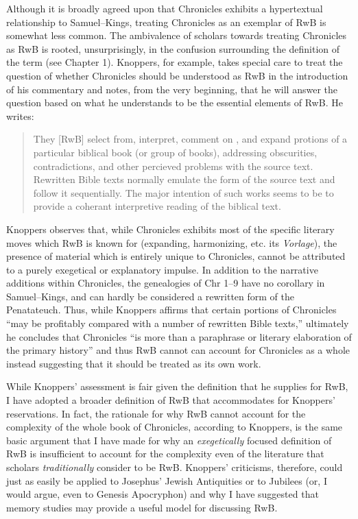 Although it is broadly agreed upon that Chronicles exhibits a
hypertextual\autocite[5]{genette1997} relationship to Samuel--Kings,
treating Chronicles as an exemplar of RwB is somewhat less
common.\autocites[Though, not particularly
\emph{un}common:][]{campbell_zsengeller2014}{zahn_lim-collins2010}{bernstein_textus2005}[Alexander
considers Chronicles to be a ``prototype'' of RwB,
see][100]{alexander_carson-williamson1988} The ambivalence of scholars
towards treating Chronicles as RwB is rooted, unsurprisingly, in the
confusion surrounding the definition of the term (see Chapter 1).
Knoppers, for example, takes special care to treat the question of
whether Chronicles should be understood as RwB in the introduction of
his commentary and notes, from the very beginning, that he will answer
the question based on what he understands to be the essential elements
of RwB.\autocite[ , 129--134]{knoppers2003} He writes:

\begin{quote}
They {[}RwB{]} select from, interpret, comment on , and expand protions
of a particular biblical book (or group of books), addressing
obscurities, contradictions, and other percieved problems with the
source text. Rewritten Bible texts normally emulate the form of the
source text and follow it sequentially. The major intention of such
works seems to be to provide a coherant interpretive reading of the
biblical text.\autocite[130]{knoppers2003}
\end{quote}

Knoppers observes that, while Chronicles exhibits most of the specific
literary moves which RwB is known for (expanding, harmonizing, etc. its
\emph{Vorlage}), the presence of material which is entirely unique to
Chronicles, cannot be attributed to a purely exegetical or explanatory
impulse. In addition to the narrative additions within Chronicles, the
genealogies of Chr 1--9 have no corollary in Samuel--Kings, and can
hardly be considered a rewritten form of the
Penatateuch.\autocite[132]{knoppers2003} Thus, while Knoppers affirms
that certain portions of Chronicles ``may be profitably compared with a
number of rewritten Bible texts,''\autocite[131]{knoppers2003}
ultimately he concludes that Chronicles ``is more than a paraphrase or
literary elaboration of the primary
history''\autocite[134]{knoppers2003} and thus RwB cannot can account
for Chronicles as a whole instead suggesting that it should be treated
as its own work.\autocite[131--134]{knoppers2003}

While Knoppers' assessment is fair given the definition that he supplies
for RwB, I have adopted a broader definition of RwB that accommodates
for Knoppers' reservations. In fact, the rationale for why RwB cannot
account for the complexity of the whole book of Chronicles, according to
Knoppers, is the same basic argument that I have made for why an
\emph{exegetically} focused definition of RwB is insufficient to account
for the complexity even of the literature that scholars
\emph{traditionally} consider to be RwB. Knoppers' criticisms,
therefore, could just as easily be applied to Josephus'
Jewish Antiquities or to Jubilees (or, I would argue, even to
Genesis Apocryphon) and why I have suggested that memory studies may
provide a useful model for discussing RwB.

